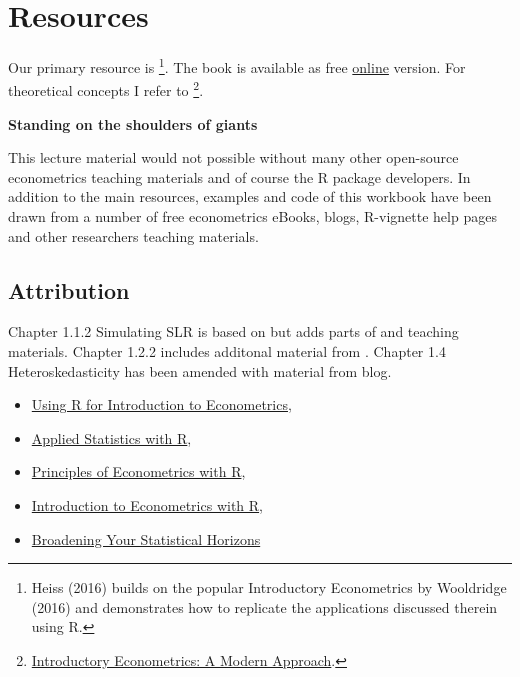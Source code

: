 \documentclass[]{book}
\providecommand{\tightlist}{%
  \setlength{\itemsep}{0pt}\setlength{\parskip}{0pt}}
\let\rmarkdownfootnote\footnote%
\def\footnote{\protect\rmarkdownfootnote}
\begin{document}
\hypertarget{resources}{%
\section*{Resources}\label{resources}}

Our primary resource is \citet{heiss2016using} \footnote{Heiss (2016)
  builds on the popular Introductory Econometrics by Wooldridge (2016)
  and demonstrates how to replicate the applications discussed therein
  using R.}. The book is available as free
\href{http://www.urfie.net/read.html}{online} version. For theoretical
concepts I refer to \citet{wooldridge2015introductory}\footnote{\href{https://books.google.ee/books/about/Introductory_Econometrics_A_Modern_Appro.html?id=wUF4BwAAQBAJ\&source=kp_cover\&redir_esc=y}{Introductory
  Econometrics: A Modern Approach}.}.

\textbf{Standing on the shoulders of giants}

This lecture material would not possible without many other open-source
econometrics teaching materials and of course the R package developers.
In addition to the main resources, examples and code of this workbook
have been drawn from a number of free econometrics eBooks, blogs,
R-vignette help pages and other researchers teaching materials.

\hypertarget{attribution}{%
\subsection*{Attribution}\label{attribution}}

Chapter 1.1.2 Simulating SLR is based on \citet{heiss2016using} but adds
parts of \citet{dalpiaz2016} and \citet{colonescu2018} teaching
materials. Chapter 1.2.2 includes additonal material from
\citet{Hanck2018}. Chapter 1.4 Heteroskedasticity has been amended with
material from \citet{Rodrigues2018} blog.

\begin{itemize}
\tightlist
\item
  \href{https://emwikts1970.github.io/URFITE-Bookdown/}{Using R for
  Introduction to Econometrics}, \citet{Hanck2018}
\item
  \href{https://daviddalpiaz.github.io/appliedstats/}{Applied Statistics
  with R}, \citet{dalpiaz2016}
\item
  \href{https://bookdown.org/ccolonescu/RPoE4/}{Principles of
  Econometrics with R}, \citet{colonescu2018}
\item
  \href{https://scpoecon.github.io/ScPoEconometrics/}{Introduction to
  Econometrics with R}, \citet{oswald2018introduction}
\item
  \href{https://bookdown.org/roback/bookdown-bysh/}{Broadening Your
  Statistical Horizons}
\end{itemize}
\end{document}
